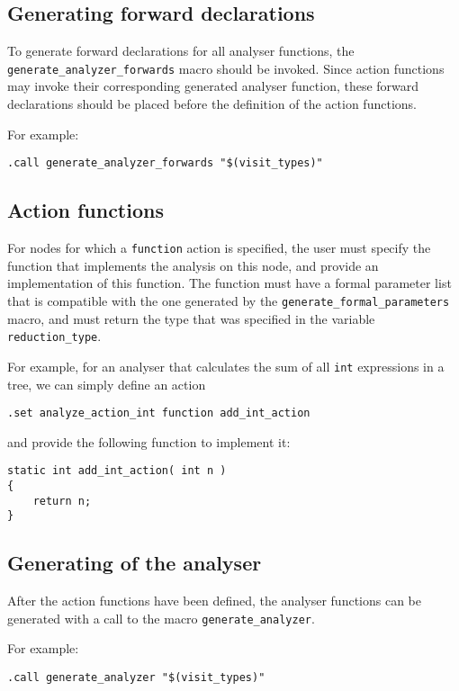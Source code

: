 \subsection{Generating forward declarations}
\begin{sloppypar}
To generate forward declarations for all analyser functions, the
\verb'generate_analyzer_forwards' macro should be invoked.
Since action functions may invoke their corresponding generated analyser
function, these forward declarations should be placed before the
definition of the action functions.
\end{sloppypar}
\par
For example:
\begin{verbatim}
.call generate_analyzer_forwards "$(visit_types)"
\end{verbatim}
\subsection{Action functions}
For nodes for which a \texttt{function} action is specified, the user
must specify the function that implements the analysis on this node,
and provide an implementation of this function.  The function must have
a formal parameter list that is compatible with the one generated by the
\verb'generate_formal_parameters' macro, and must return the type that
was specified in the variable \verb'reduction_type'.

For example, for an analyser that calculates the sum of all \texttt{int}
expressions in a tree, we can simply define an action
\begin{verbatim}
.set analyze_action_int function add_int_action
\end{verbatim}
and provide the following function to implement it:
\begin{verbatim}
static int add_int_action( int n )
{
    return n;
}
\end{verbatim}

\subsection{Generating of the analyser}
After the action functions have been defined, the analyser functions can
be generated with a call to the macro \verb'generate_analyzer'.
\par
For example:
\begin{verbatim}
.call generate_analyzer "$(visit_types)"
\end{verbatim}
